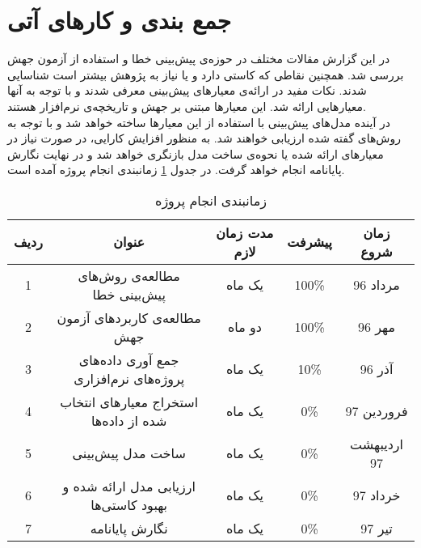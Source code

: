 \section{جمع بندی و کارهای آتی}
\label{sec:future}
 در این گزارش مقالات مختلف در حوزه‌ی پیش‌بینی خطا و استفاده از آزمون جهش بررسی شد. همچنین نقاطی که  کاستی دارد و یا نیاز به پژوهش بیشتر است شناسایی شدند. نکات مفید در ارائه‌ی معیارهای پیش‌بینی معرفی شدند و با توجه به آنها معیارهایی ارائه شد. این معیارها مبتنی بر جهش و تاریخچه‌ی نرم‌افزار هستند.\\
 
   در آینده مدل‌های پیش‌بینی با استفاده از این معیارها ساخته خواهد شد و با توجه به روش‌های گفته شده ارزیابی خواهند شد.  به منظور افزایش کارایی، در صورت نیاز در معیارهای ارائه شده یا نحوه‌ی ساخت مدل    بازنگری خواهد شد و در نهایت نگارش پایانامه انجام خواهد گرفت. در جدول \ref{tab:schedule} زمانبندی انجام پروژه آمده است.

\begin{table}[H] 
	\centering \caption{زمانبندی انجام پروژه}
	\label{tab:schedule}

	\begin{tabular}{|c|c|c|c|c|}
		\hline
		\hline
		 ردیف & عنوان & مدت زمان لازم & پیشرفت & زمان شروع
	 \\
		\hline
		\hline
1& مطالعه‌ی روش‌های پیش‌بینی خطا & یک ماه& 100\% & مرداد 96
		\\
		\hline
2 &مطالعه‌ی کاربردهای آزمون جهش  &دو ماه &100\%  &مهر 96 
		\\
		\hline
3 & جمع آوری داده‌های پروژه‌های نرم‌افزاری &  یک ماه& 10\% & آذر 96
		\\
		\hline
4 & استخراج معیارهای انتخاب شده از داده‌ها &  یک ماه& 0\% & فروردین 97
\\
\hline
5 & ساخت مدل پیش‌بینی &  یک ماه& 0\% & اردیبهشت 97
\\
\hline
6 & ارزیابی مدل ارائه شده و بهبود کاستی‌ها &  یک ماه& 0\% & خرداد 97
\\
\hline
7 & نگارش پایانامه &  یک ماه& 0\% & تیر 97\\


\hline
		
	 
	\end{tabular}
\end{table}
